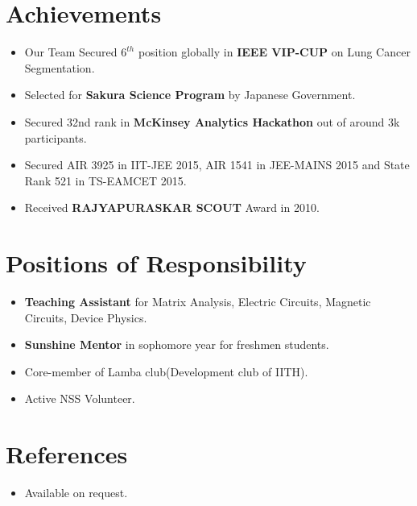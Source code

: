 \documentclass[letterpaper,11pt]{article}
\newcommand{\resumeSubHeadingListStart}{\begin{itemize}[leftmargin=*]}
\newcommand{\resumeSubHeadingListEnd}{\end{itemize}}
\begin{document}

      
      
  
\section{Achievements}
  \resumeSubHeadingListStart
  	\itemsep-0.15em
  	\item Our Team Secured \textbf{$6^{th}$} position globally in \textbf{IEEE VIP-CUP} on Lung Cancer Segmentation.
  	\item{Selected for \textbf{Sakura Science Program} by Japanese Government.}
    \item{Secured 32nd rank in \textbf{McKinsey Analytics Hackathon} out of around 3k participants.}
    \item{Secured AIR 3925 in IIT-JEE 2015, AIR 1541 in JEE-MAINS 2015 and State Rank 521 in TS-EAMCET 2015.}    
    \item{Received \textbf{RAJYAPURASKAR SCOUT} Award in 2010.} 
    
  \resumeSubHeadingListEnd
  
\section{Positions of Responsibility}
  \resumeSubHeadingListStart
  	\itemsep-0.15em
      \item{\textbf{Teaching Assistant} for Matrix Analysis, Electric Circuits, Magnetic Circuits, Device Physics.}
    \item{\textbf{Sunshine Mentor} in sophomore year for freshmen students.}
    \item{Core-member of Lamba club(Development club of IITH).}    
    \item{Active NSS Volunteer.}
  \resumeSubHeadingListEnd

\section{References}
  \resumeSubHeadingListStart
  	\itemsep-0.15em
      \item{Available on request.}

    
  \resumeSubHeadingListEnd
\end{document}
